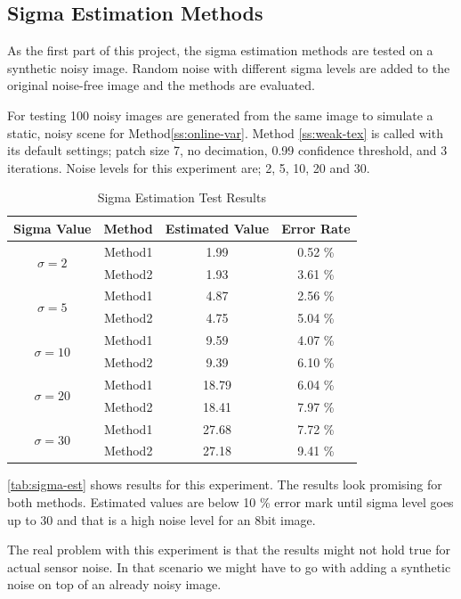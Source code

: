 \documentclass[10pt,twocolumn,letterpaper]{article}
\begin{document}
\subsection{Sigma Estimation Methods}
As the first part of this project, the sigma estimation methods are tested on a synthetic noisy image. Random noise with different sigma levels are added to the original noise-free image and the methods are evaluated.

For testing 100 noisy images are generated from the same image to simulate a static, noisy scene for Method\ref{ss:online-var}. Method \ref{ss:weak-tex} is called with its default settings; patch size 7, no decimation, 0.99 confidence threshold, and 3 iterations. Noise levels for this experiment are; 2, 5, 10, 20 and 30.

\begin{table}[h!]
	\centering
	\caption{Sigma Estimation Test Results}
	\label{tab:sigma-est}
	\begin{tabular}{cccc}
		\toprule
		\bfseries Sigma Value & \bfseries Method & \bfseries Estimated Value & \bfseries Error Rate\\
		\midrule
		\multirow{2}{*}{\(\sigma=2\)} & Method1 & 1.99 & 0.52 \% \\
		& Method2 & 1.93 & 3.61 \% \\
		\multirow{2}{*}{\(\sigma=5\)} & Method1 & 4.87 & 2.56 \% \\
		& Method2 & 4.75 & 5.04 \% \\
		\multirow{2}{*}{\(\sigma=10\)} & Method1 & 9.59 & 4.07 \% \\
		& Method2 & 9.39 & 6.10 \% \\
		\multirow{2}{*}{\(\sigma=20\)} & Method1 & 18.79 & 6.04 \% \\
		& Method2 & 18.41 & 7.97 \% \\
		\multirow{2}{*}{\(\sigma=30\)} & Method1 & 27.68 & 7.72 \% \\
		& Method2 & 27.18 & 9.41 \% \\
		\bottomrule
	\end{tabular}
\end{table}

\autoref{tab:sigma-est} shows results for this experiment. The results look promising for both methods. Estimated values are below 10 \% error mark until sigma level goes up to 30 and that is a high noise level for an 8bit image.

The real problem with this experiment is that the results might not hold true for actual sensor noise. In that scenario we might have to go with adding a synthetic noise on top of an already noisy image.
\end{document}
